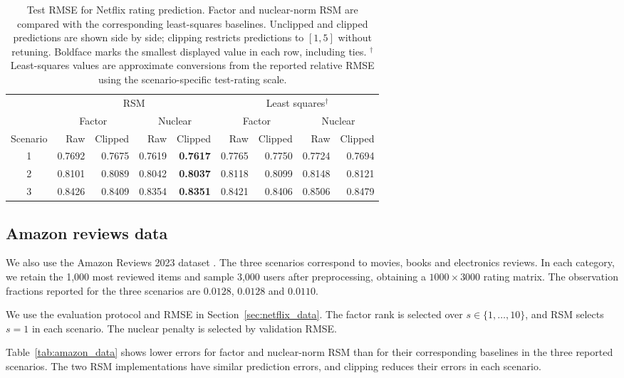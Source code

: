 \documentclass[numsec,webpdf,modern,large,namedate]{oup-authoring-template}
\theoremstyle{plain}
\theoremstyle{remark}
\newif\ifmarkchanges
\newenvironment{revision}{\begingroup\ifmarkchanges\color{red}\fi}{\endgroup}
\begin{document}
\begin{table}[!htbp]
\centering
\caption{Test RMSE for Netflix rating prediction. Factor and nuclear-norm RSM are compared with the corresponding least-squares baselines. Unclipped and clipped predictions are shown side by side; clipping restricts predictions to $[1,5]$ without retuning. Boldface marks the smallest displayed value in each row, including ties. $^{\dagger}$Least-squares values are approximate conversions from the reported relative RMSE using the scenario-specific test-rating scale.}
\label{tab:netflix_data}
\begingroup
\small
{}
\setlength{\tabcolsep}{4pt}
\begin{tabular}{@{}crrrrrrrr@{}}
\toprule
 & \multicolumn{4}{c}{RSM} & \multicolumn{4}{c}{Least squares$^{\dagger}$} \\
\cmidrule(lr){2-5}\cmidrule(lr){6-9}
 & \multicolumn{2}{c}{Factor} & \multicolumn{2}{c}{Nuclear} & \multicolumn{2}{c}{Factor} & \multicolumn{2}{c}{Nuclear} \\
\cmidrule(lr){2-3}\cmidrule(lr){4-5}\cmidrule(lr){6-7}\cmidrule(lr){8-9}
Scenario & Raw & Clipped & Raw & Clipped & Raw & Clipped & Raw & Clipped \\
\midrule
1 & 0.7692 & 0.7675 & 0.7619 & \textbf{0.7617} & 0.7765 & 0.7750 & 0.7724 & 0.7694 \\
2 & 0.8101 & 0.8089 & 0.8042 & \textbf{0.8037} & 0.8118 & 0.8099 & 0.8148 & 0.8121 \\
3 & 0.8426 & 0.8409 & 0.8354 & \textbf{0.8351} & 0.8421 & 0.8406 & 0.8506 & 0.8479 \\
\bottomrule
\end{tabular}
\endgroup
\end{table}

\begin{revision}
\subsection{Amazon reviews data}
\label{sec:amazon_data}
We also use the Amazon Reviews 2023 dataset \citep{hou2024bridging}. The three scenarios correspond to movies, books and electronics reviews. In each category, we retain the 1,000 most reviewed items and sample 3,000 users after preprocessing, obtaining a $1000\times3000$ rating matrix. The observation fractions reported for the three scenarios are $0.0128$, $0.0128$ and $0.0110$.

We use the evaluation protocol and RMSE in Section~\ref{sec:netflix_data}. The factor rank is selected over $s\in\{1,\ldots,10\}$, and RSM selects $s=1$ in each scenario. The nuclear penalty is selected by validation RMSE.

Table~\ref{tab:amazon_data} shows lower errors for factor and nuclear-norm RSM than for their corresponding baselines in the three reported scenarios. The two RSM implementations have similar prediction errors, and clipping reduces their errors in each scenario.

\end{revision}
\end{document}
